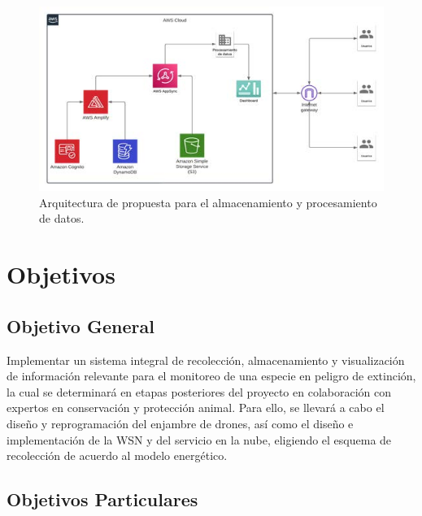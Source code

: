 \begin{figure}[h]
    \centering
    \includegraphics[width=0.8\linewidth]{imagenes/img7_arquitectura_propuesta_aws.jpg}
    \caption{Arquitectura de propuesta para el almacenamiento y procesamiento de datos.}
    \label{fig:enter-label}
\end{figure}


\chapter{Objetivos}
\section{Objetivo General}
Implementar un sistema integral de recolección, almacenamiento y visualización de información relevante para el monitoreo de una especie en peligro de extinción, la cual se determinará en etapas posteriores del proyecto en colaboración con expertos en conservación y protección animal.
Para ello, se llevará a cabo el diseño y reprogramación del enjambre de drones, así como el diseño e implementación de la WSN y del servicio en la nube, eligiendo el esquema de recolección de acuerdo al modelo energético.

\section{Objetivos Particulares}
